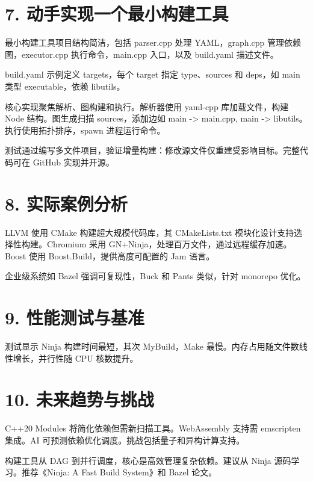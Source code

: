 \chapter{7. 动手实现一个最小构建工具}
最小构建工具项目结构简洁，包括 parser.cpp 处理 YAML，graph.cpp 管理依赖图，executor.cpp 执行命令，main.cpp 入口，以及 build.yaml 描述文件。\par
build.yaml 示例定义 targets，每个 target 指定 type、sources 和 deps，如 main 类型 executable，依赖 libutils。\par
核心实现聚焦解析、图构建和执行。解析器使用 yaml-cpp 库加载文件，构建 Node 结构。图生成扫描 sources，添加边如 main -> main.cpp, main -> libutils。执行使用拓扑排序，spawn 进程运行命令。\par
测试通过编写多文件项目，验证增量构建：修改源文件仅重建受影响目标。完整代码可在 GitHub 实现并开源。\par
\chapter{8. 实际案例分析}
LLVM 使用 CMake 构建超大规模代码库，其 CMakeLists.txt 模块化设计支持选择性构建。Chromium 采用 GN+Ninja，处理百万文件，通过远程缓存加速。Boost 使用 Boost.Build，提供高度可配置的 Jam 语言。\par
企业级系统如 Bazel 强调可复现性，Buck 和 Pants 类似，针对 monorepo 优化。\par
\chapter{9. 性能测试与基准}
测试显示 Ninja 构建时间最短，其次 MyBuild，Make 最慢。内存占用随文件数线性增长，并行性随 CPU 核数提升。\par
\chapter{10. 未来趋势与挑战}
C++20 Modules 将简化依赖但需新扫描工具。WebAssembly 支持需 emscripten 集成。AI 可预测依赖优化调度。挑战包括量子和异构计算支持。\par
构建工具从 DAG 到并行调度，核心是高效管理复杂依赖。建议从 Ninja 源码学习。推荐《Ninja: A Fast Build System》和 Bazel 论文。\par
